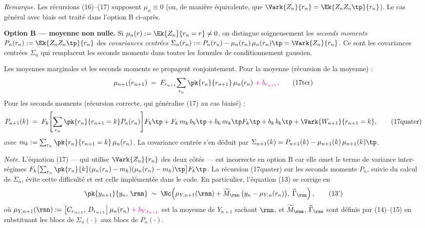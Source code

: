 \documentclass[12pt, a4paper]{article}
\begin{document}
\smallskip
\noindent\textit{Remarque.} Les récursions (16)--(17) supposent $\mu_n \equiv 0$
(ou, de manière équivalente, que $\Vark{Z_n}{r_n} = \Ek{Z_n Z_n\tp}{r_n}$).
Le cas général avec biais est traité dans l'option B ci-après.

{\color{green!60!black}
\smallskip
\noindent\textbf{Option B — moyenne non nulle.}
Si $\mu_n(r) := \Ek{Z_n}{r_n=r} \neq 0$, on distingue soigneusement
les \emph{seconds moments} $P_n(r_n) := \Ek{Z_n Z_n\tp}{r_n}$
des \emph{covariances centrées} $\Sigma_n(r_n) := P_n(r_n) - \mu_n(r_n)\,\mu_n(r_n)\tp = \Vark{Z_n}{r_n}$.
Ce sont les covariances centrées $\Sigma_n$ qui remplacent les seconds moments dans
toutes les formules de conditionnement gaussien.

Les moyennes marginales et les seconds moments se propagent conjointement.
Pour la moyenne (récursion de la moyenne) :
\begin{equation}
  \mu_{n+1}(r_{n+1}) \;=\; F_{r_{n+1}}\!\sum_{r_n} \pk{r_n}{r_{n+1}}\,\mu_n(r_n)
  {\color{magenta}\;+\; b_{r_{n+1}}}.
  \tag{17ter}
\end{equation}
Pour les seconds moments (récursion correcte, qui généralise (17) au cas biaisé) :
\begin{equation}
  P_{n+1}(k)
  \;=\; F_k\!\left[\sum_{r_n}\pk{r_n}{r_{n+1}=k}P_n(r_n)\right]\!F_k\tp
    + F_k\,m_k\,b_k\tp + b_k\,m_k\tp F_k\tp + b_k\,b_k\tp
    + \Vark{W_{n+1}}{r_{n+1}=k},
  \tag{17quater}
\end{equation}
avec $m_k := \sum_{r_n}\pk{r_n}{r_{n+1}=k}\,\mu_n(r_n)$.
La covariance centrée s'en déduit par $\Sigma_{n+1}(k) = P_{n+1}(k) - \mu_{n+1}(k)\,\mu_{n+1}(k)\tp$.

\noindent\textit{Note.} L'équation (17) — qui utilise $\Vark{Z_n}{r_n}$ des deux côtés — est
incorrecte en option B car elle omet le terme de variance inter-régimes
$F_k\bigl[\sum_{r_n}\pk{r_n}{k}(\mu_n(r_n)-m_k)(\mu_n(r_n)-m_k)\tp\bigr]F_k\tp$.
La récursion (17quater) sur les seconds moments $P_n$, suivie du calcul de $\Sigma_n$,
évite cette difficulté et est celle implémentée dans le code.
En particulier, l'équation (13) se corrige en
\begin{equation}
  \pk{y_{n+1}}{y_n,\,\rnn}
  \;\sim\; \Nc\!\left(
    \mu_{Y,n+1}(\rnn)
    + \widetilde{M}_{\rnn}\,\bigl(y_n - \mu_{Y,n}(r_n)\bigr),\;
    \widetilde{\Gamma}_{\rnn}
  \right),
  \tag{13'}
\end{equation}
où $\mu_{Y,n+1}(\rnn) := \bigl[C_{r_{n+1}},\,D_{r_{n+1}}\bigr]\,\mu_n(r_n)
{\color{magenta}\;+\; b_{Y,r_{n+1}}}$
est la moyenne de $Y_{n+1}$ sachant $\rnn$, et $\widetilde{M}_{\rnn}$, $\widetilde{\Gamma}_{\rnn}$
sont définis par (14)--(15) en substituant les blocs de $\Sigma_n(\cdot)$ aux blocs de $P_n(\cdot)$.
}
\end{document}
